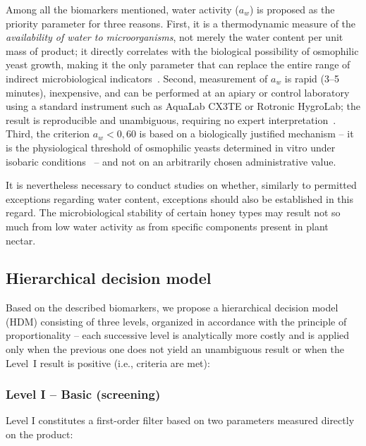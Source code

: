 Among all the biomarkers mentioned, water activity
($a_w$) is proposed as the priority parameter for three reasons.
First, it is a thermodynamic measure of the \emph{availability
of water to microorganisms}, not merely the water content per unit
mass of product; it directly correlates with the biological
possibility of osmophilic yeast growth, making it the only
parameter that can replace the entire range of indirect
microbiological indicators~\cite{ruegg1981,waaw2006}.
Second, measurement of $a_w$ is rapid (3--5 minutes), inexpensive,
and can be performed at an apiary or control laboratory using a
standard instrument such as AquaLab CX3TE or Rotronic HygroLab;
the result is reproducible and unambiguous, requiring no expert
interpretation~\cite{zamora2006}.
Third, the criterion $a_w < 0{,}60$ is based on a biologically
justified mechanism -- it is the physiological threshold of
osmophilic yeasts determined in vitro under isobaric
conditions~\cite{waaw2006,ruegg1981} -- and not on an arbitrarily
chosen administrative value.

It is nevertheless necessary to conduct studies on whether,
similarly to permitted exceptions regarding water content, exceptions
should also be established in this regard. The microbiological
stability of certain honey types may result not so much from low
water activity as from specific components present in plant nectar.

\subsection{Hierarchical decision model}

Based on the described biomarkers, we propose a hierarchical
decision model (HDM) consisting of three levels, organized in
accordance with the principle of proportionality -- each successive
level is analytically more costly and is applied only when the
previous one does not yield an unambiguous result or when the
Level~I result is positive (i.e., criteria are met):

\subsubsection{Level I -- Basic (screening)}

Level I constitutes a first-order filter based on two parameters
measured directly on the product:

